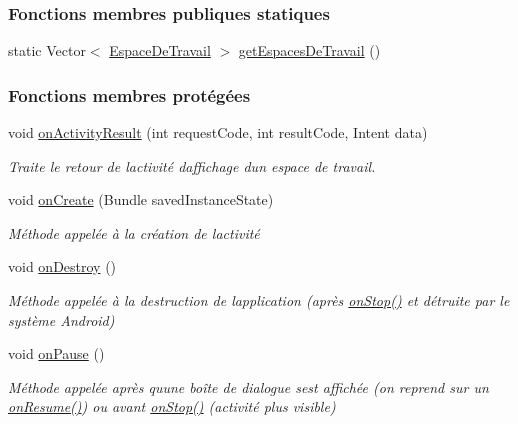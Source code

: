 \subsubsection*{Fonctions membres publiques statiques}
\begin{DoxyCompactItemize}
\item 
static Vector$<$ \hyperlink{classcom_1_1lasalle_1_1meeting_1_1_espace_de_travail}{Espace\+De\+Travail} $>$ \hyperlink{classcom_1_1lasalle_1_1meeting_1_1_i_h_m_meeting_aad942bca6cb6117dc57fb58142f0728c}{get\+Espaces\+De\+Travail} ()
\end{DoxyCompactItemize}
\subsubsection*{Fonctions membres protégées}
\begin{DoxyCompactItemize}
\item 
void \hyperlink{classcom_1_1lasalle_1_1meeting_1_1_i_h_m_meeting_aa7f5623eef9a049cf786ff15a4c63274}{on\+Activity\+Result} (int request\+Code, int result\+Code, Intent data)
\begin{DoxyCompactList}\small\item\em Traite le retour de l\textquotesingle{}activité d\textquotesingle{}affichage d\textquotesingle{}un espace de travail. \end{DoxyCompactList}\item 
void \hyperlink{classcom_1_1lasalle_1_1meeting_1_1_i_h_m_meeting_a34012ee88c1e079fef93ed115978d669}{on\+Create} (Bundle saved\+Instance\+State)
\begin{DoxyCompactList}\small\item\em Méthode appelée à la création de l\textquotesingle{}activité \end{DoxyCompactList}\item 
void \hyperlink{classcom_1_1lasalle_1_1meeting_1_1_i_h_m_meeting_a949a2219b9b5c29f7c1a9855a782a676}{on\+Destroy} ()
\begin{DoxyCompactList}\small\item\em Méthode appelée à la destruction de l\textquotesingle{}application (après \hyperlink{classcom_1_1lasalle_1_1meeting_1_1_i_h_m_meeting_a74e6b3e48ce9a26612916194d4692e6a}{on\+Stop()} et détruite par le système Android) \end{DoxyCompactList}\item 
void \hyperlink{classcom_1_1lasalle_1_1meeting_1_1_i_h_m_meeting_a1663a4b9bcff059ab95a72ca019cffb1}{on\+Pause} ()
\begin{DoxyCompactList}\small\item\em Méthode appelée après qu\textquotesingle{}une boîte de dialogue s\textquotesingle{}est affichée (on reprend sur un \hyperlink{classcom_1_1lasalle_1_1meeting_1_1_i_h_m_meeting_af9a99a4aa01c58f7d85e0d6e6d13eaa4}{on\+Resume()}) ou avant \hyperlink{classcom_1_1lasalle_1_1meeting_1_1_i_h_m_meeting_a74e6b3e48ce9a26612916194d4692e6a}{on\+Stop()} (activité plus visible) \end{DoxyCompactList}\item 

\end{DoxyCompactItemize}
